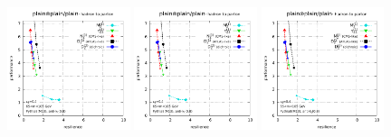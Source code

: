 \documentclass[11pt,letterpaper]{article}
\begin{document}
\begin{figure}
  \includegraphics[width=0.32\textwidth,page=65]{figures/shape-scan-levels.pdf}
  \hfill
  \includegraphics[width=0.32\textwidth,page=59]{figures/shape-scan-levels.pdf}
  \hfill
  \includegraphics[width=0.32\textwidth,page=53]{figures/shape-scan-levels.pdf}
  \caption{}\label{fig:shapes-ATLAS}
\end{figure}
\end{document}
